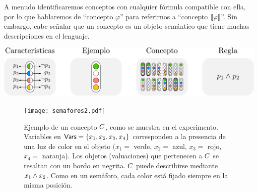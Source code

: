 {%

A menudo identificaremos conceptos con cualquier fórmula compatible con ella, por lo que hablaremos de ``concepto $\varphi$'' para referirnos a ``concepto $\llbracket \varphi\rrbracket$''. Sin embargo, cabe señalar que un concepto es un objeto semántico que tiene muchas descripciones en el lenguaje.
}

\includegraphics[scale=.6]{../figuras/pre/notacion.pdf}



 \begin{figure}[t!]
 \vspace{-0.5cm}
  \centering
  \texttt{[image: semaforos2.pdf]}
  \caption{Ejemplo de un concepto $C$, como se muestra en el experimento. Variables en ${\sf Vars}=\{x_1,x_2,x_3,x_4\}$ corresponden a la presencia de una luz de color en el objeto ($x_{1}=$ verde, $x_2=$ azul, $x_3=$ rojo, $x_4=$ naranja). Los objetos (valuaciones) que pertenecen a $C$ se resaltan con un bordo en negrita. $C$ puede describirse mediante $x_1\wedge x_2$. Como en un semáforo, cada color está fijado siempre en la misma posición.}
  \label{semaforos}
\end{figure}

